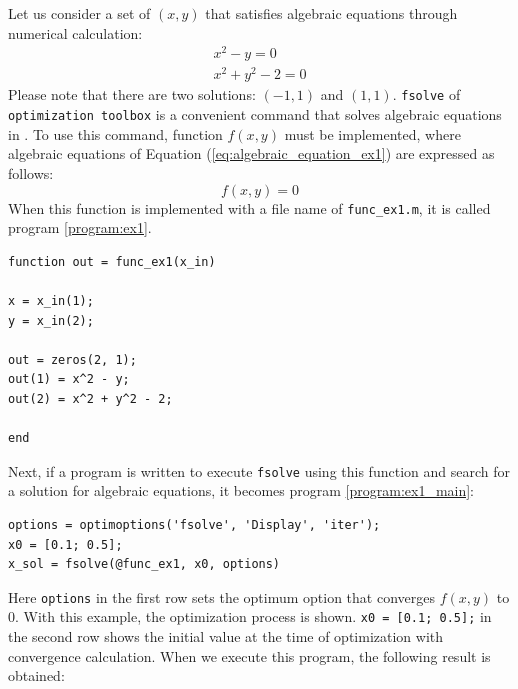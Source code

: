 \documentclass[graybox, envcountchap]{svmult}
\begin{document}
\begin{example}\label{ex:algenraic_equation_ex1}
Let us consider a set of $(x, y)$ that satisfies algebraic equations through numerical calculation: 
\begin{subequations}\label{eq:algebraic_equation_ex1}
\begin{align}
x^2 - y = 0\\
x^2 + y^2 - 2 = 0
\end{align}
\end{subequations}
Please note that there are two solutions: $(-1, 1)$ and $(1, 1)$. \verb|fsolve| of \verb|optimization toolbox| is a convenient command that solves algebraic equations in \matlab.
To use this command, function $f(x,y)$ must be implemented, where algebraic equations of Equation (\ref{eq:algebraic_equation_ex1}) are expressed as follows:
\[
f(x,y)=0
\]
When this function is implemented with a file name of \verb|func_ex1.m|, it is called program \nobreak\ref{program:ex1}.

\smallskip
\begin{PROGRAMA}[count,title={func\_ex1.m}]\label{program:ex1}
\begin{verbatim}
function out = func_ex1(x_in)

x = x_in(1);
y = x_in(2);

out = zeros(2, 1);
out(1) = x^2 - y;
out(2) = x^2 + y^2 - 2;

end
\end{verbatim}
\end{PROGRAMA}

Next, if a program is written to execute \verb|fsolve| using this function and search for a solution for algebraic equations, it becomes program \nobreak\ref{program:ex1_main}:
\smallskip
\begin{PROGRAMA}[count,title={main\_ex1.m}]\label{program:ex1_main}
\begin{verbatim}
options = optimoptions('fsolve', 'Display', 'iter');
x0 = [0.1; 0.5];
x_sol = fsolve(@func_ex1, x0, options)
\end{verbatim}
\end{PROGRAMA}

Here \verb|options| in the first row sets the optimum option that converges $f(x,y)$ to 0.
With this example, the optimization process is shown. \verb|x0 = [0.1; 0.5];| in the second row shows the initial value at the time of optimization with convergence calculation.
When we execute this program, the following result is obtained:


\end{example}
\end{document}
